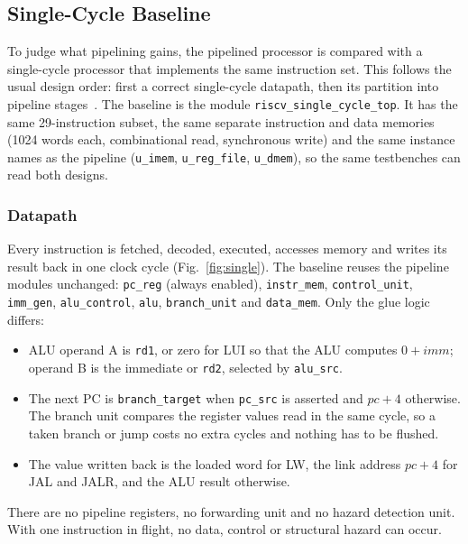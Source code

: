 \subsection{Single-Cycle Baseline}
To judge what pipelining gains, the pipelined processor is compared with a
single-cycle processor that implements the same instruction set. This follows
the usual design order: first a correct single-cycle datapath, then its
partition into pipeline stages~\cite{pattersonRV,harrisRV}. The baseline is the
module \texttt{riscv\_single\_cycle\_top}. It has the same 29-instruction subset,
the same separate instruction and data memories (1024 words each, combinational
read, synchronous write) and the same instance names as the pipeline
(\texttt{u\_imem}, \texttt{u\_reg\_file}, \texttt{u\_dmem}), so the same testbenches
can read both designs.

\subsubsection{Datapath}
Every instruction is fetched, decoded, executed, accesses memory and writes its
result back in one clock cycle (Fig.~\ref{fig:single}). The baseline reuses the
pipeline modules unchanged: \texttt{pc\_reg} (always enabled),
\texttt{instr\_mem}, \texttt{control\_unit}, \texttt{imm\_gen},
\texttt{alu\_control}, \texttt{alu}, \texttt{branch\_unit} and \texttt{data\_mem}.
Only the glue logic differs:
\begin{itemize}
  \item ALU operand A is \texttt{rd1}, or zero for LUI so that the ALU computes
        $0 + imm$; operand B is the immediate or \texttt{rd2}, selected by
        \texttt{alu\_src}.
  \item The next PC is \texttt{branch\_target} when \texttt{pc\_src} is
        asserted and $pc + 4$ otherwise. The branch unit compares the register
        values read in the same cycle, so a taken branch or jump costs no
        extra cycles and nothing has to be flushed.
  \item The value written back is the loaded word for LW, the link address
        $pc + 4$ for JAL and JALR, and the ALU result otherwise.
\end{itemize}
There are no pipeline registers, no forwarding unit and no hazard detection
unit. With one instruction in flight, no data, control or structural hazard can
occur.

